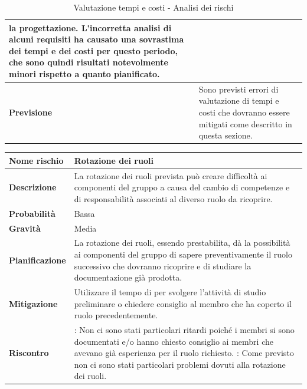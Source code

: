 \documentclass[12pt,a4paper]{article}
\begin{document}
\begin{table}[H]
\begin{center}
\begin{tabular}{p{} p{}}
                    la progettazione. L'incorretta analisi di alcuni requisiti ha causato una sovrastima dei tempi
                    e dei costi per questo periodo, che sono quindi risultati notevolmente minori rispetto a quanto
                    pianificato. \\
            \midrule
            \textbf{Previsione} & Sono previsti errori di valutazione di tempi e costi che dovranno essere mitigati come descritto in questa sezione. \\
			\bottomrule
		\end{tabular}
		\caption{Valutazione tempi e costi - Analisi dei rischi}
	\end{center}
\end{table}

\begin{table}[H]
	\begin{center}
		\begin{tabular}{p{} p{}}
			\toprule
			\textbf{Nome rischio} & \textbf{Rotazione dei ruoli} \\
			\midrule
			\midrule
			\textbf{Descrizione} & La rotazione dei ruoli prevista può creare difficoltà ai 
                componenti del gruppo a causa del cambio di competenze e di responsabilità 
                associati al diverso ruolo da ricoprire. \\
			\midrule
			\textbf{Probabilità} & Bassa \\
			\midrule
			\textbf{Gravità} & Media \\
			\midrule
			\textbf{Pianificazione} &  La rotazione dei ruoli, essendo prestabilita, dà la possibilità ai componenti del gruppo di sapere preventivamente il ruolo successivo che dovranno ricoprire e di studiare la documentazione già prodotta. \\
			\midrule
			\textbf{Mitigazione} & Utilizzare il tempo di \mgls{slack} per svolgere l'attività di studio preliminare o chiedere consiglio al membro che ha coperto il ruolo precedentemente. \\
            \midrule
            \textbf{Riscontro} & 
                \textbf{\FA{}}: Non ci sono stati particolari ritardi poiché i membri si sono documentati 
                    e/o hanno chiesto consiglio ai membri che avevano già esperienza per il ruolo richiesto. \newline
                \textbf{\FAD{}}: Come previsto non ci sono stati particolari problemi dovuti alla rotazione
                    dei ruoli. \newline

\end{tabular}
\end{center}
\end{table}
\end{document}
